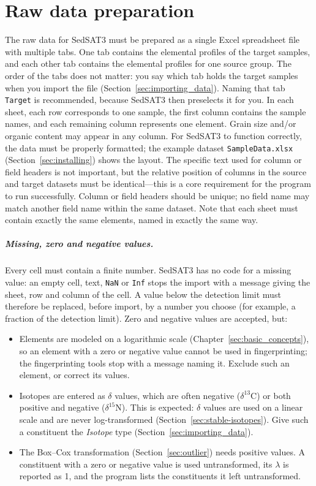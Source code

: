 \documentclass[12pt]{report}
\begin{document}
\chapter{Raw data preparation}\label{chap:raw-data}
The raw data for SedSAT3 must be prepared as a single Excel spreadsheet file with multiple tabs. One tab contains the elemental profiles of the target samples, and each other tab contains the elemental profiles for one source group. The order of the tabs does not matter: you say which tab holds the target samples when you import the file (Section~\ref{sec:importing_data}). Naming that tab \texttt{Target} is recommended, because SedSAT3 then preselects it for you. In each sheet, each row corresponds to one sample, the first column contains the sample names, and each remaining column represents one element. Grain size and/or organic content may appear in any column. For SedSAT3 to function correctly, the data must be properly formatted; the example dataset \texttt{SampleData.xlsx} (Section~\ref{sec:installing}) shows the layout. The specific text used for column or field headers is not important, but the relative position of columns in the source and target datasets must be identical---this is a core requirement for the program to run successfully. Column or field headers should be unique; no field name may match another field name within the same dataset. Note that each sheet must contain exactly the same elements, named in exactly the same way.

\paragraph{Missing, zero and negative values.} Every cell must contain a finite number. SedSAT3 has no code for a missing value: an empty cell, text, \texttt{NaN} or \texttt{Inf} stops the import with a message giving the sheet, row and column of the cell. A value below the detection limit must therefore be replaced, before import, by a number you choose (for example, a fraction of the detection limit). Zero and negative values are accepted, but:
\begin{itemize}
    \item Elements are modeled on a logarithmic scale (Chapter~\ref{sec:basic_concepts}), so an element with a zero or negative value cannot be used in fingerprinting; the fingerprinting tools stop with a message naming it. Exclude such an element, or correct its values.
    \item Isotopes are entered as $\delta$ values, which are often negative ($\delta^{13}$C) or both positive and negative ($\delta^{15}$N). This is expected: $\delta$ values are used on a linear scale and are never log-transformed (Section~\ref{sec:stable-isotopes}). Give such a constituent the \textit{Isotope} type (Section~\ref{sec:importing_data}).
    \item The Box--Cox transformation (Section~\ref{sec:outlier}) needs positive values. A constituent with a zero or negative value is used untransformed, its $\lambda$ is reported as 1, and the program lists the constituents it left untransformed.
\end{itemize}
\end{document}
